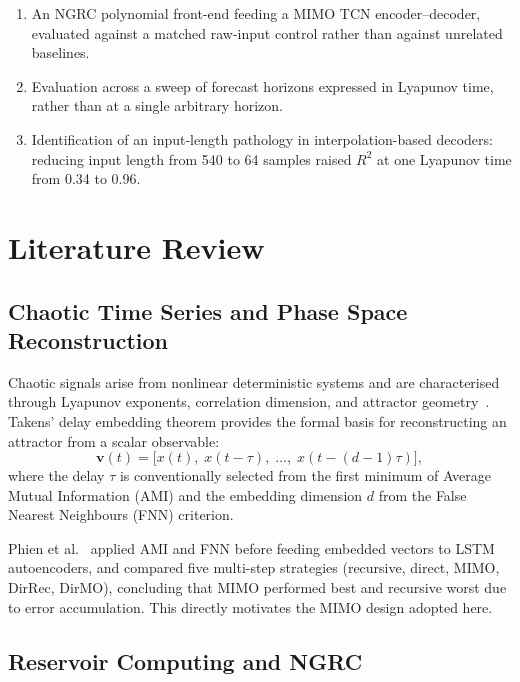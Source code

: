 \documentclass[11pt,a4paper]{article}
\begin{document}
\begin{enumerate}[leftmargin=*]
  \item An NGRC polynomial front-end feeding a MIMO TCN encoder--decoder, evaluated against a matched raw-input control rather than against unrelated baselines.
  \item Evaluation across a sweep of forecast horizons expressed in Lyapunov time, rather than at a single arbitrary horizon.
  \item Identification of an input-length pathology in interpolation-based decoders: reducing input length from 540 to 64 samples raised $R^2$ at one Lyapunov time from 0.34 to 0.96.
\end{enumerate}


\section{Literature Review}

\subsection{Chaotic Time Series and Phase Space Reconstruction}

Chaotic signals arise from nonlinear deterministic systems and are characterised through Lyapunov exponents, correlation dimension, and attractor geometry~\cite{ramadevi2022}.
Takens' delay embedding theorem provides the formal basis for reconstructing an attractor from a scalar observable:
\begin{equation}
  \mathbf{v}(t) = \bigl[x(t),\; x(t-\tau),\; \ldots,\; x(t-(d-1)\tau)\bigr],
\end{equation}
where the delay $\tau$ is conventionally selected from the first minimum of Average Mutual Information (AMI) and the embedding dimension $d$ from the False Nearest Neighbours (FNN) criterion.

Phien et al.~\cite{phien2023} applied AMI and FNN before feeding embedded vectors to LSTM autoencoders, and compared five multi-step strategies (recursive, direct, MIMO, DirRec, DirMO), concluding that MIMO performed best and recursive worst due to error accumulation.
This directly motivates the MIMO design adopted here.

\subsection{Reservoir Computing and NGRC}
\end{document}
